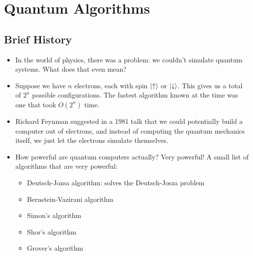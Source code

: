 \section{Quantum Algorithms}
\subsection{Brief History}
\begin{itemize}
	\item In the world of physics, there was a problem: we couldn't simulate quantum systems. What does that even mean?
	\item Suppose we have \( n \) electrons, each with spin \( \ket{\uparrow} \) or \( \ket{\downarrow} \). 
		This gives us a total of \( 2^{n} \) possible configurations. The fastest algorithm known at the time 
		was one that took \( O(2^{n}) \) time.
	\item Richard Feynman suggested in a 1981 talk that we could potentially build a computer out of 
		electrons, and instead of computing the quantum mechanics itself, we just let the electrons 
		simulate themselves.
	\item How powerful are quantum computers actually? Very powerful! A small list of algorithms that 
		are very powerful:
		\begin{itemize}
			\item Deutsch-Jozsa algorithm: solves the Deutsch-Josza problem
			\item Bernstein-Vazirani algorithm
			\item Simon's algorithm
			\item Shor's algorithm
			\item Grover's algorithm
		\end{itemize}
\end{itemize}
